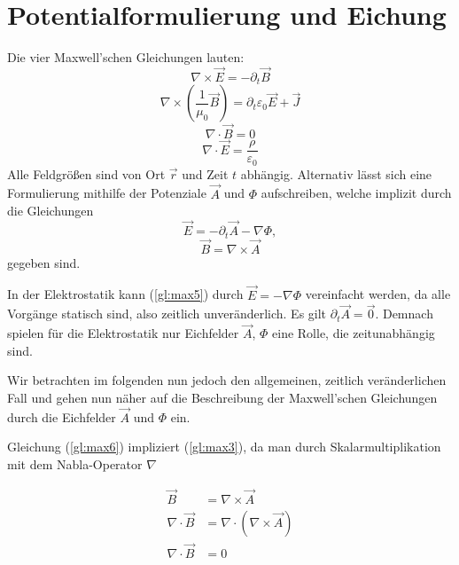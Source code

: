 \section{Potentialformulierung und Eichung}
Die vier Maxwell'schen Gleichungen lauten:
\begin{equation}
\label{gl:max1}
\nabla \times \vec{E} = -\partial_t\vec{B}
\end{equation}
\begin{equation}
\label{gl:max2}
\nabla \times \left(\frac{1}{\mu_0}\vec{B}\right) = \partial_t\varepsilon_0\vec{E} + \vec{J}
\end{equation}
\begin{equation}
\label{gl:max3}
\nabla \cdot \vec{B} = 0
\end{equation}
\begin{equation}
\label{gl:max4}
\nabla \cdot \vec{E} = \frac{\rho}{\varepsilon_0}
\end{equation}
Alle Feldgrößen sind von Ort $\vec{r}$ und Zeit $t$ abhängig. Alternativ lässt sich eine Formulierung mithilfe der Potenziale $\vec{A}$ und $\Phi$ aufschreiben, welche implizit durch die Gleichungen
\begin{equation}
\label{gl:max5}
\vec{E} = -\partial_t\vec{A} - \nabla\Phi,
\end{equation}
\begin{equation}
\label{gl:max6}
\vec{B} = \nabla\times\vec{A}
\end{equation}
gegeben sind.

In der Elektrostatik kann (\ref{gl:max5}) durch $\vec{E} = - \nabla\Phi$ vereinfacht werden, da alle Vorgänge statisch sind, also zeitlich unveränderlich. Es gilt $\partial_t\vec{A} = \vec{0}$. Demnach spielen für die Elektrostatik nur Eichfelder $\vec{A}$, $\Phi$ eine Rolle, die zeitunabhängig sind.

Wir betrachten im folgenden nun jedoch den allgemeinen, zeitlich veränderlichen Fall und gehen nun näher auf die Beschreibung der Maxwell'schen Gleichungen durch die Eichfelder $\vec{A}$ und $\Phi$ ein.

Gleichung (\ref{gl:max6}) impliziert (\ref{gl:max3}), da man durch Skalarmultiplikation mit dem Nabla-Operator $\nabla$

\begin{align*}
\vec{B} &= \nabla\times\vec{A} \\
\nabla \cdot \vec{B} &= \nabla \cdot (\nabla\times\vec{A}) \\
\nabla \cdot \vec{B} &= 0
\end{align*}

